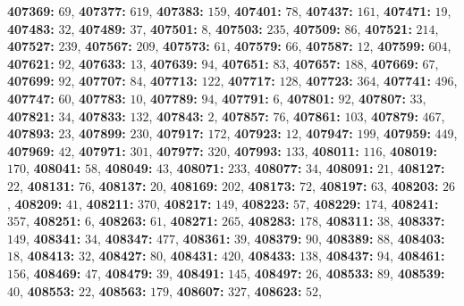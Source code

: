 \textsf{\bfseries 407369:} $69$, \textsf{\bfseries 407377:} $619$, \textsf{\bfseries 407383:} $159$, \textsf{\bfseries 407401:} $78$, \textsf{\bfseries 407437:} $161$, \textsf{\bfseries 407471:} $19$, \textsf{\bfseries 407483:} $32$, \textsf{\bfseries 407489:} $37$, \textsf{\bfseries 407501:} $8$, \textsf{\bfseries 407503:} $235$, \textsf{\bfseries 407509:} $86$, \textsf{\bfseries 407521:} $214$, \textsf{\bfseries 407527:} $239$, \textsf{\bfseries 407567:} $209$, \textsf{\bfseries 407573:} $61$, \textsf{\bfseries 407579:} $66$, \textsf{\bfseries 407587:} $12$, \textsf{\bfseries 407599:} $604$, \textsf{\bfseries 407621:} $92$, \textsf{\bfseries 407633:} $13$, \textsf{\bfseries 407639:} $94$, \textsf{\bfseries 407651:} $83$, \textsf{\bfseries 407657:} $188$, \textsf{\bfseries 407669:} $67$, \textsf{\bfseries 407699:} $92$, \textsf{\bfseries 407707:} $84$, \textsf{\bfseries 407713:} $122$, \textsf{\bfseries 407717:} $128$, \textsf{\bfseries 407723:} $364$, \textsf{\bfseries 407741:} $496$, \textsf{\bfseries 407747:} $60$, \textsf{\bfseries 407783:} $10$, \textsf{\bfseries 407789:} $94$, \textsf{\bfseries 407791:} $6$, \textsf{\bfseries 407801:} $92$, \textsf{\bfseries 407807:} $33$, \textsf{\bfseries 407821:} $34$, \textsf{\bfseries 407833:} $132$, \textsf{\bfseries 407843:} $2$, \textsf{\bfseries 407857:} $76$, \textsf{\bfseries 407861:} $103$, \textsf{\bfseries 407879:} $467$, \textsf{\bfseries 407893:} $23$, \textsf{\bfseries 407899:} $230$, \textsf{\bfseries 407917:} $172$, \textsf{\bfseries 407923:} $12$, \textsf{\bfseries 407947:} $199$, \textsf{\bfseries 407959:} $449$, \textsf{\bfseries 407969:} $42$, \textsf{\bfseries 407971:} $301$, \textsf{\bfseries 407977:} $320$, \textsf{\bfseries 407993:} $133$, \textsf{\bfseries 408011:} $116$, \textsf{\bfseries 408019:} $170$, \textsf{\bfseries 408041:} $58$, \textsf{\bfseries 408049:} $43$, \textsf{\bfseries 408071:} $233$, \textsf{\bfseries 408077:} $34$, \textsf{\bfseries 408091:} $21$, \textsf{\bfseries 408127:} $22$, \textsf{\bfseries 408131:} $76$, \textsf{\bfseries 408137:} $20$, \textsf{\bfseries 408169:} $202$, \textsf{\bfseries 408173:} $72$, \textsf{\bfseries 408197:} $63$, \textsf{\bfseries 408203:} $26$, \textsf{\bfseries 408209:} $41$, \textsf{\bfseries 408211:} $370$, \textsf{\bfseries 408217:} $149$, \textsf{\bfseries 408223:} $57$, \textsf{\bfseries 408229:} $174$, \textsf{\bfseries 408241:} $357$, \textsf{\bfseries 408251:} $6$, \textsf{\bfseries 408263:} $61$, \textsf{\bfseries 408271:} $265$, \textsf{\bfseries 408283:} $178$, \textsf{\bfseries 408311:} $38$, \textsf{\bfseries 408337:} $149$, \textsf{\bfseries 408341:} $34$, \textsf{\bfseries 408347:} $477$, \textsf{\bfseries 408361:} $39$, \textsf{\bfseries 408379:} $90$, \textsf{\bfseries 408389:} $88$, \textsf{\bfseries 408403:} $18$, \textsf{\bfseries 408413:} $32$, \textsf{\bfseries 408427:} $80$, \textsf{\bfseries 408431:} $420$, \textsf{\bfseries 408433:} $138$, \textsf{\bfseries 408437:} $94$, \textsf{\bfseries 408461:} $156$, \textsf{\bfseries 408469:} $47$, \textsf{\bfseries 408479:} $39$, \textsf{\bfseries 408491:} $145$, \textsf{\bfseries 408497:} $26$, \textsf{\bfseries 408533:} $89$, \textsf{\bfseries 408539:} $40$, \textsf{\bfseries 408553:} $22$, \textsf{\bfseries 408563:} $179$, \textsf{\bfseries 408607:} $327$, \textsf{\bfseries 408623:} $52$, 
